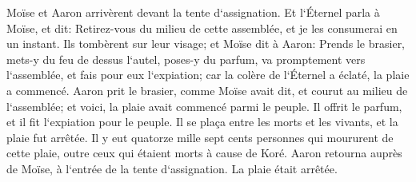\verse Moïse et Aaron arrivèrent devant la tente d`assignation. 
\verse Et l`Éternel parla à Moïse, et dit: 
\verse Retirez-vous du milieu de cette assemblée, et je les consumerai en un instant. Ils tombèrent sur leur visage; 
\verse et Moïse dit à Aaron: Prends le brasier, mets-y du feu de dessus l`autel, poses-y du parfum, va promptement vers l`assemblée, et fais pour eux l`expiation; car la colère de l`Éternel a éclaté, la plaie a commencé. 
\verse Aaron prit le brasier, comme Moïse avait dit, et courut au milieu de l`assemblée; et voici, la plaie avait commencé parmi le peuple. Il offrit le parfum, et il fit l`expiation pour le peuple. 
\verse Il se plaça entre les morts et les vivants, et la plaie fut arrêtée. 
\verse Il y eut quatorze mille sept cents personnes qui moururent de cette plaie, outre ceux qui étaient morts à cause de Koré. 
\verse Aaron retourna auprès de Moïse, à l`entrée de la tente d`assignation. La plaie était arrêtée. 

